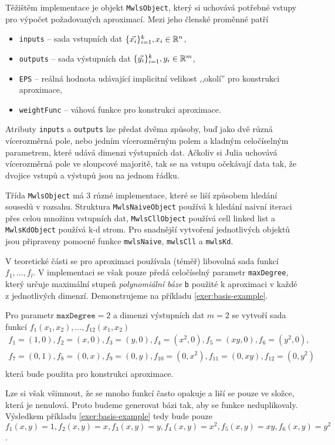 Těžištěm implementace je objekt \texttt{MwlsObject}, který si uchovává potřebné vstupy pro výpočet požadovaných aproximací. Mezi jeho členské proměnné patří
\begin{itemize}
  \item \texttt{inputs} -- sada vstupních dat $\{\vec{x_i}\}_{i=1}^k, x_i \in \mathbb{R}^n$,
  \item \texttt{outputs} -- sada výstupních dat $\{\vec{y_i}\}_{i=1}^k, y_i \in \mathbb{R}^m$,
  \item \texttt{EPS} -- reálná hodnota udávající implicitní velikost ,,okolí'' pro konstrukci aproximace,
  \item \texttt{weightFunc} -- váhová funkce pro konstrukci aproximace.
\end{itemize}
Atributy \texttt{inputs} a \texttt{outputs} lze předat dvěma způsoby, buď jako dvě různá vícerozměrná pole, nebo jedním vícerozměrným polem a kladným celočíselným parametrem, které udává dimenzi výstupních dat. Ačkoliv si Julia uchovává vícerozměrná pole ve sloupcové majoritě, tak se na vstupu očekávají data tak, že dvojice vstupů a výstupů jsou na jednom řádku.

Třída \texttt{MwlsObject} má 3 různé implementace, které se liší způsobem hledání sousedů v rozsahu. Struktura \texttt{MwlsNaiveObject} používá k hledání naivní iteraci přes celou množinu vstupních dat, \texttt{MwlsCllObject} používá cell linked list a \texttt{MwlsKdObject} používá k-d strom. Pro snadnější vytvoření jednotlivých objektů jsou připraveny pomocné funkce \texttt{mwlsNaive}, \texttt{mwlsCll} a \texttt{mwlsKd}.

V teoretické části se pro aproximaci používala (téměř) libovolná sada funkcí $f_1, \ldots, f_l$. V implementaci se však pouze předá celočíselný parametr \texttt{maxDegree}, který určuje maximální stupeň \textit{polynomiální báze} \texttt{b} použité k aproximaci v každé z jednotlivých dimenzí. Demonstrujeme na příkladu \ref{exer:basis-example}.
\begin{priklad}
  \label{exer:basis-example}
  Pro parametr $\texttt{maxDegree} = 2$ a dimenzi výstupních dat $m = 2$ se vytvoří sada funkcí $f_1(x_1, x_2), \ldots, f_{12}(x_1, x_2)$
  \begin{multline}
    f_1 = (1, 0), f_2 = (x, 0), f_3 = (y, 0), f_4 = (x^2, 0), f_5 = (xy, 0), f_6 = (y^2, 0),\\
    f_7 = (0, 1), f_8 = (0, x), f_9 = (0, y), f_{10} = (0, x^2), f_{11} = (0, xy), f_{12} = (0, y^2)\\
  \end{multline}
  která bude použita pro konstrukci aproximace.
\end{priklad}
Lze si však všimnout, že se mnoho funkcí často opakuje a liší se pouze ve složce, která je nenulová. Proto budeme generovat bázi tak, aby se funkce neduplikovaly. Výsledkem příkladu \ref{exer:basis-example} tedy bude pouze $f_1(x, y) = 1, f_2(x, y) = x, f_3(x,y) = y, f_4(x,y)=x^2,f_5(x, y)=xy,f_6(x, y)=y^2$.

